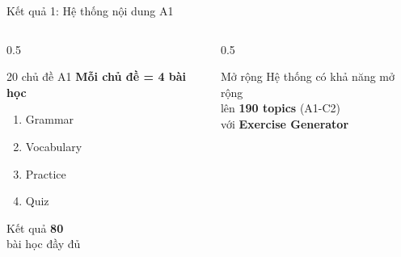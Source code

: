 \documentclass[notheorems,hyperref={bookmarks=true}]{beamer}
\begin{document}
\begin{frame}{Kết quả 1: Hệ thống nội dung A1}
\begin{columns}
    \begin{column}{0.5\textwidth}
        \begin{exampleblock}{20 chủ đề A1}
            \textbf{Mỗi chủ đề = 4 bài học}
            \begin{enumerate}
                \item Grammar
                \item Vocabulary
                \item Practice
                \item Quiz
            \end{enumerate}
        \end{exampleblock}
        
        \vspace{0.3cm}
        
        \begin{alertblock}{Kết quả}
            \centering
            \Huge \textbf{80}\\
            \small bài học đầy đủ
        \end{alertblock}
    \end{column}
    \begin{column}{0.5\textwidth}
        \centering
        
        \vspace{0.5cm}
        
        \begin{exampleblock}{Mở rộng}
            \footnotesize
            Hệ thống có khả năng mở rộng\\
            lên \textbf{190 topics} (A1-C2)\\
            với \textbf{Exercise Generator}
        \end{exampleblock}
    \end{column}
\end{columns}
\end{frame}

\end{document}
